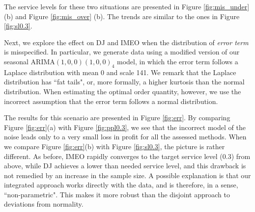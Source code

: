 \documentclass{article}
\begin{document}
The service levels for these two situations are presented in Figure \ref{fig:mis_under} (b) and Figure \ref{fig:mis_over} (b). The trends are similar to the ones in Figure \ref{fig:sl0.3}.

Next, we explore the effect on DJ and IMEO when the distribution of \emph{error term} is misspecified. In particular, we generate data using a modified version of our seasonal ARIMA$(1,0,0)(1,0,0)_4$ model, in which the error term follows a Laplace distribution with mean 0 and scale 141. We remark that the Laplace distribution has ``fat tails", or, more formally, a higher kurtosis than the normal distribution. When estimating the optimal order quantity, however, we use the incorrect assumption that the error term follows a normal distribution.

The results for this scenario are presented in Figure \ref{fig:err}.
By comparing Figure \ref{fig:err}(a) with Figure \ref{fig:ppl0.3}, we see that the incorrect model of the noise leads only to a very small loss in profit for all the assessed methods. When we compare Figure \ref{fig:err}(b) with Figure \ref{fig:sl0.3}, the picture is rather different. As before, IMEO rapidly converges to the target service level (0.3) from above, while DJ achieves a lower than needed service level, and this drawback is not remedied by an increase in the sample size. A possible explanation is that our integrated approach works directly with the data, and is therefore, in a sense, ``non-parametric". This makes it more robust than the disjoint approach to deviations from normality.
\end{document}
